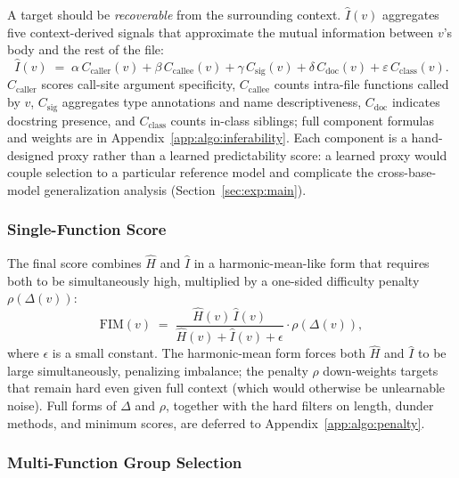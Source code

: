 A target should be \emph{recoverable} from the surrounding context.
$\hat{I}(v)$ aggregates five context-derived signals that approximate the
mutual information between $v$'s body and the rest of the file:
%
\begin{equation}
  \hat{I}(v) \;=\; \alpha\,C_{\mathrm{caller}}(v)
              + \beta\,C_{\mathrm{callee}}(v)
              + \gamma\,C_{\mathrm{sig}}(v)
              + \delta\,C_{\mathrm{doc}}(v)
              + \varepsilon\,C_{\mathrm{class}}(v).
  \label{eq:inferability}
\end{equation}
%
$C_{\mathrm{caller}}$ scores call-site argument specificity,
$C_{\mathrm{callee}}$ counts intra-file functions called by $v$,
$C_{\mathrm{sig}}$ aggregates type annotations and name descriptiveness,
$C_{\mathrm{doc}}$ indicates docstring presence, and
$C_{\mathrm{class}}$ counts in-class siblings; full component formulas
and weights are in Appendix~\ref{app:algo:inferability}. Each component
is a hand-designed proxy rather than a learned predictability score: a
learned proxy would couple selection to a particular reference model and
complicate the cross-base-model generalization analysis
(Section~\ref{sec:exp:main}).

\subsubsection{Single-Function Score}
\label{sec:method:single}

The final score combines $\hat{H}$ and $\hat{I}$ in a harmonic-mean-like
form that requires both to be simultaneously high, multiplied by a
one-sided difficulty penalty $\rho(\Delta(v))$:
%
\begin{equation}
  \mathrm{FIM}(v) \;=\;
  \frac{\hat{H}(v)\,\hat{I}(v)}{\hat{H}(v) + \hat{I}(v) + \epsilon}
  \cdot \rho\!\left(\Delta(v)\right),
  \label{eq:fim_single}
\end{equation}
%
where $\epsilon$ is a small constant. The harmonic-mean form forces both
$\hat{H}$ and $\hat{I}$ to be large simultaneously, penalizing imbalance;
the penalty $\rho$ down-weights targets that remain hard even given full
context (which would otherwise be unlearnable noise). Full forms of
$\Delta$ and $\rho$, together with the hard filters on length, dunder
methods, and minimum scores, are deferred to
Appendix~\ref{app:algo:penalty}.

\subsubsection{Multi-Function Group Selection}
\label{sec:method:groups}

